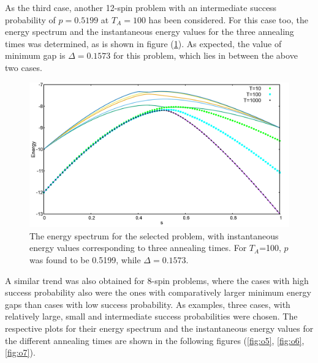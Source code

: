 \documentclass[../main.tex]{subfiles}
\begin{document}
As the third case, another 12-spin problem with an intermediate success probability of $p=0.5199$ at $T_A= 100$ has been considered. For this case too, the energy spectrum and the instantaneous energy values for the three annealing times was determined, as is shown in figure (\ref{fig:o4}). As expected, the value of minimum gap is $\Delta=0.1573$ for this problem, which lies in between the above two cases. 
\begin{figure}[H]
\centering 
\includegraphics[scale=0.24]{528_s12_O.png}
\caption{The energy spectrum for the selected problem, with instantaneous energy values corresponding to three annealing times. For $T_A$=100, $p$ was found to be 0.5199, while $\Delta=0.1573.$}
\label{fig:o4}
\end{figure}
A similar trend was also obtained for 8-spin problems, where the cases with high success probability also were the ones with comparatively larger minimum energy gaps than cases with low success probability.  As examples, three cases, with relatively large, small and intermediate success probabilities were chosen. The respective plots for their energy spectrum and the instantaneous energy values for the different annealing times are shown in the following figures (\ref{fig:o5}, \ref{fig:o6}, \ref{fig:o7}).
\end{document}
